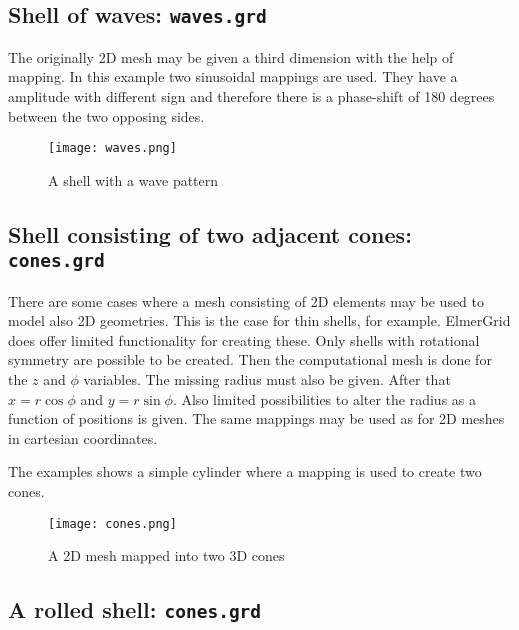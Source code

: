 \subsection*{Shell of waves: \texttt{waves.grd}}

The originally 2D mesh may be given a third dimension with the help of mapping.
In this example two sinusoidal mappings are used. They have a amplitude
with different sign and therefore there is a phase-shift of 180 degrees between the 
two opposing sides. 

\begin{figure}
\begin{center}
\texttt{[image: waves.png]}
\end{center}
\caption{A shell with a wave pattern}
\label{pic9b}
\end{figure}




\subsection*{Shell consisting of two adjacent cones: \texttt{cones.grd}}

There are some cases where a mesh consisting of 2D elements 
may be used to model also 2D geometries. This is the case for
thin shells, for example. ElmerGrid does offer limited 
functionality for creating these. Only 
shells with rotational symmetry are possible to be created. 
Then the computational mesh is done for the $z$ and $\phi$ variables.
The missing radius must also be given.
After that $x=r \cos \phi$ and $y= r \sin \phi$.
Also limited possibilities to alter the radius as 
a function of positions is given. The same mappings may be used
as for 2D meshes in cartesian coordinates.

The examples shows a simple cylinder where a mapping is
used to create two cones. 

\begin{figure}
\begin{center}
\texttt{[image: cones.png]}
\end{center}
\caption{A 2D mesh mapped into two 3D cones}
\label{pic10}
\end{figure}




\subsection*{A rolled shell: \texttt{cones.grd}}

